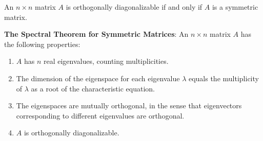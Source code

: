     \begin{Thm}\label{orthogonally-dianonalizable}
        An $n\times n$ matrix $A$ is orthogonally diagonalizable if and only if $A$ is a symmetric matrix.
    \end{Thm}

    \begin{Thm}\label{spectral-theorem}
        \textbf{The Spectral Theorem for Symmetric Matrices}:
        An $n \times n$ matrix $A$ has the following properties:
        \begin{enumerate}
            \item $A$ has $n$ real eigenvalues, counting multiplicities.
            \item The dimension of the eigenspace for each eigenvalue $\lambda$ equals the multiplicity of $\lambda$ as a root of the characteristic equation.
            \item  The eigenspaces are mutually orthogonal, in the sense that eigenvectors corresponding to different eigenvalues are orthogonal.
            \item $A$ is orthogonally diagonalizable.
        \end{enumerate}
    \end{Thm}

